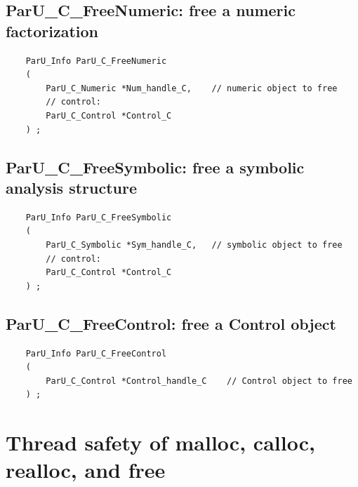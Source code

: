 \documentclass[12pt]{article}
\begin{document}
\subsection{{\sf ParU\_C\_FreeNumeric}: free a numeric factorization}

    {\footnotesize
    \begin{verbatim}
    ParU_Info ParU_C_FreeNumeric
    (
        ParU_C_Numeric *Num_handle_C,    // numeric object to free
        // control:
        ParU_C_Control *Control_C
    ) ; \end{verbatim} }

\subsection{{\sf ParU\_C\_FreeSymbolic}: free a symbolic analysis structure}

    {\footnotesize
    \begin{verbatim}
    ParU_Info ParU_C_FreeSymbolic
    (
        ParU_C_Symbolic *Sym_handle_C,   // symbolic object to free
        // control:
        ParU_C_Control *Control_C
    ) ; \end{verbatim} }

\subsection{{\sf ParU\_C\_FreeControl}: free a Control object}

    {\footnotesize
    \begin{verbatim}
    ParU_Info ParU_C_FreeControl
    (
        ParU_C_Control *Control_handle_C    // Control object to free
    ) ; \end{verbatim} }

\section{Thread safety of {\sf malloc}, {\sf calloc}, {\sf realloc}, and
{\sf free}}
\end{document}
